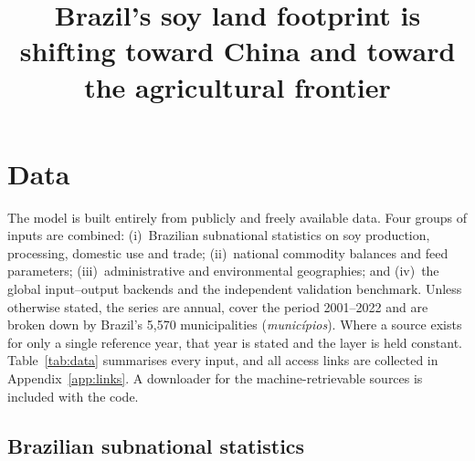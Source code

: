 \documentclass[pdflatex,sn-nature]{sn-jnl}%
\begin{document}
\title[Brazil's shifting soy land footprint]{Brazil's soy land footprint
is shifting toward China and toward the agricultural frontier}

\author*[1]{ }




\maketitle

\section{Data}\label{sec:data}

The model is built entirely from publicly and freely available data. Four
groups of inputs are combined: (i)~Brazilian subnational statistics on soy
production, processing, domestic use and trade; (ii)~national commodity
balances and feed parameters; (iii)~administrative and environmental
geographies; and (iv)~the global input--output backends and the independent
validation benchmark. Unless otherwise stated, the series are annual, cover the period 2001–2022 and are broken down by Brazil's 5,570 municipalities
(\emph{munic\'ipios}). Where a source exists for only a single reference
year, that year is stated and the layer is held constant.
Table~\ref{tab:data} summarises every input, and all access links are collected
in Appendix~\ref{app:links}. A downloader for the machine-retrievable
sources is included with the code.

\subsection{Brazilian subnational statistics}\label{subsec:brazil}
\end{document}
